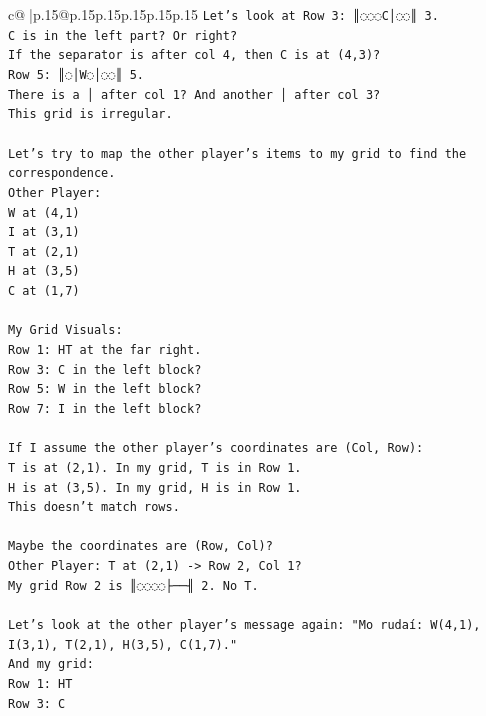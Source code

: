 \documentclass{article}
\begin{document}
{\begin{supertabular}{c@{$\;$}|p{.15\linewidth}@{}p{.15\linewidth}p{.15\linewidth}p{.15\linewidth}p{.15\linewidth}p{.15\linewidth}}
{{{\texttt{Let's look at Row 3: ║◌◌◌C│◌◌║ 3.} \\
\texttt{C is in the left part? Or right?} \\
\texttt{If the separator is after col 4, then C is at (4,3)?} \\
\texttt{Row 5: ║◌│W◌│◌◌║ 5.} \\
\texttt{There is a │ after col 1? And another │ after col 3?} \\
\texttt{This grid is irregular.} \\
\\ 
\texttt{Let's try to map the other player's items to my grid to find the correspondence.} \\
\texttt{Other Player:} \\
\texttt{W at (4,1)} \\
\texttt{I at (3,1)} \\
\texttt{T at (2,1)} \\
\texttt{H at (3,5)} \\
\texttt{C at (1,7)} \\
\\ 
\texttt{My Grid Visuals:} \\
\texttt{Row 1: HT at the far right.} \\
\texttt{Row 3: C in the left block?} \\
\texttt{Row 5: W in the left block?} \\
\texttt{Row 7: I in the left block?} \\
\\ 
\texttt{If I assume the other player's coordinates are (Col, Row):} \\
\texttt{T is at (2,1). In my grid, T is in Row 1.} \\
\texttt{H is at (3,5). In my grid, H is in Row 1.} \\
\texttt{This doesn't match rows.} \\
\\ 
\texttt{Maybe the coordinates are (Row, Col)?} \\
\texttt{Other Player: T at (2,1) {-}> Row 2, Col 1?} \\
\texttt{My grid Row 2 is ║◌◌◌◌├──╢ 2. No T.} \\
\\ 
\texttt{Let's look at the other player's message again: "Mo rudaí: W(4,1), I(3,1), T(2,1), H(3,5), C(1,7)."} \\
\texttt{And my grid:} \\
\texttt{Row 1: HT} \\
\texttt{Row 3: C} \\
}}}
\end{supertabular}}
\end{document}
